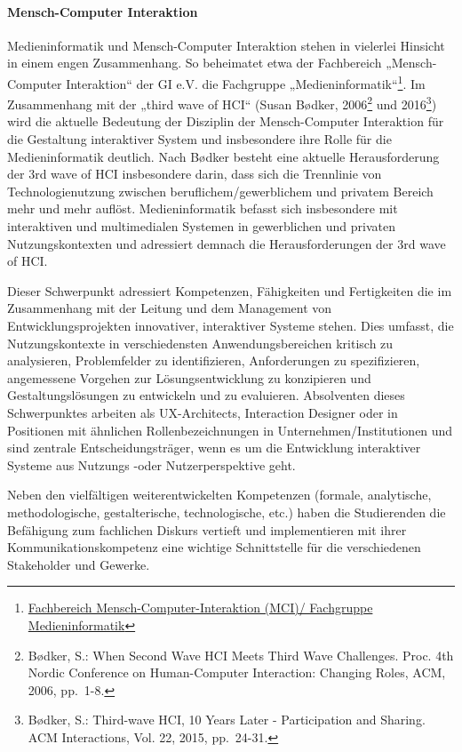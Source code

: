 \paragraph{Mensch-Computer
Interaktion}\label{mensch-computer-interaktion}

Medieninformatik und Mensch-Computer Interaktion stehen in vielerlei
Hinsicht in einem engen Zusammenhang. So beheimatet etwa der Fachbereich
„Mensch-Computer Interaktion`` der GI e.V. die Fachgruppe
„Medieninformatik``\footnote{\href{http://fb-mci.gi.de/mensch-computer-interaktion-mci/fachgruppen/medieninformatik.html}{Fachbereich
  Mensch-Computer-Interaktion (MCI)/ Fachgruppe Medieninformatik}}. Im
Zusammenhang mit der „third wave of HCI`` (Susan Bødker, 2006\footnote{Bødker,
  S.: When Second Wave HCI Meets Third Wave Challenges. Proc. 4th Nordic
  Conference on Human-Computer Interaction: Changing Roles, ACM, 2006,
  pp.~1-8.} und 2016\footnote{Bødker, S.: Third-wave HCI, 10 Years Later
  - Participation and Sharing. ACM Interactions, Vol. 22, 2015,
  pp.~24-31.}) wird die aktuelle Bedeutung der Disziplin der
Mensch-Computer Interaktion für die Gestaltung interaktiver System und
insbesondere ihre Rolle für die Medieninformatik deutlich. Nach Bødker
besteht eine aktuelle Herausforderung der 3rd wave of HCI insbesondere
darin, dass sich die Trennlinie von Technologienutzung zwischen
beruflichem/gewerblichem und privatem Bereich mehr und mehr auflöst.
Medieninformatik befasst sich insbesondere mit interaktiven und
multimedialen Systemen in gewerblichen und privaten Nutzungskontexten
und adressiert demnach die Herausforderungen der 3rd wave of HCI.

Dieser Schwerpunkt adressiert Kompetenzen, Fähigkeiten und Fertigkeiten
die im Zusammenhang mit der Leitung und dem Management von
Entwicklungsprojekten innovativer, interaktiver Systeme stehen. Dies
umfasst, die Nutzungskontexte in verschiedensten Anwendungsbereichen
kritisch zu analysieren, Problemfelder zu identifizieren, Anforderungen
zu spezifizieren, angemessene Vorgehen zur Lösungsentwicklung zu
konzipieren und Gestaltungslösungen zu entwickeln und zu evaluieren.
Absolventen dieses Schwerpunktes arbeiten als UX-Architects, Interaction
Designer oder in Positionen mit ähnlichen Rollenbezeichnungen in
Unternehmen/Institutionen und sind zentrale Entscheidungsträger, wenn es
um die Entwicklung interaktiver Systeme aus Nutzungs -oder
Nutzerperspektive geht.

Neben den vielfältigen weiterentwickelten Kompetenzen (formale,
analytische, methodologische, gestalterische, technologische, etc.)
haben die Studierenden die Befähigung zum fachlichen Diskurs vertieft
und implementieren mit ihrer Kommunikationskompetenz eine wichtige
Schnittstelle für die verschiedenen Stakeholder und Gewerke.

